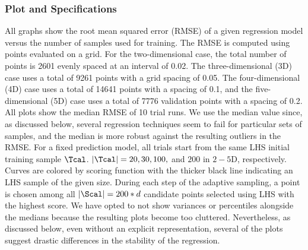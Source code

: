 \subsubsection{Plot and Specifications}
All graphs show the root mean squared error (RMSE) of a given regression model versus the number of samples used for training.
%
The RMSE is computed using points evaluated on a grid.
%
For the two-dimensional case, the total number of points is 2601 evenly spaced at an interval of 0.02.
%
The three-dimensional (3D) case uses a total of 9261 points with a grid spacing of 0.05.
%
The four-dimensional (4D) case uses a total of 14641 points with a spacing of 0.1, and the five-dimensional (5D) case uses a total of 7776 validation points with a spacing of 0.2.
%
All plots show the median RMSE of 10 trial runs.
%
We use the median value since, as discussed below, several regression techniques seem to fail for particular sets of samples, and the median is more robust against the resulting outliers in the RMSE.
%
For a fixed prediction model, all trials start from the same LHS initial training sample $\Tcal$.
%
$|\Tcal| = 20, 30, 100,$ and $200$ in $2-5$D, respectively.
%
Curves are colored by scoring function with the thicker black line indicating an LHS sample of the given size.
%
During each step of the adaptive sampling, a point is chosen among all $|\Scal| =
200*d$ candidate points selected using LHS with the highest score.
%
We have opted to not show variances or percentiles alongside the medians because the resulting plots become too cluttered.
%
Nevertheless, as discussed below, even without an explicit representation, several of the plots suggest drastic differences in the stability of the regression.


